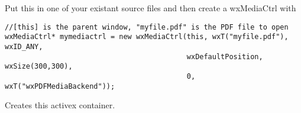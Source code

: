 Put this in one of your existant source files and then create a wxMediaCtrl with
\begin{verbatim}
//[this] is the parent window, "myfile.pdf" is the PDF file to open
wxMediaCtrl* mymediactrl = new wxMediaCtrl(this, wxT("myfile.pdf"), wxID_ANY,
                                           wxDefaultPosition, wxSize(300,300),
                                           0, wxT("wxPDFMediaBackend"));
\end{verbatim}



\label{wxactivexcontainerwxactivexcontainer}


Creates this activex container.


